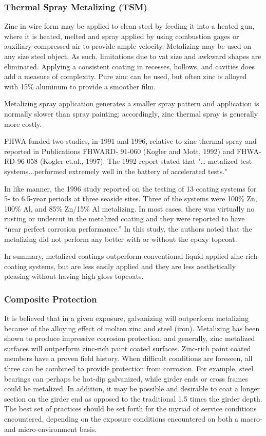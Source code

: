 \subsubsection{Thermal Spray Metalizing (TSM)}
Zinc in wire form may be applied to clean steel by feeding it into a heated gun, where it is heated, melted and
spray applied by using combustion gages or auxiliary compressed air to provide ample velocity. Metalizing may be
used on any size steel object. As such, limitations due to vat size and awkward shapes are eliminated. Applying a
consistent coating in recesses, hollows, and cavities does add a measure of complexity. Pure zinc can be used, but
often zinc is alloyed with 15\% aluminum to provide a smoother film.

Metalizing spray application generates a smaller spray pattern and application is normally slower than spray
painting; accordingly, zinc thermal spray is generally more costly.

FHWA funded two studies, in 1991 and 1996, relative to zinc thermal spray and reported in Publications FHWARD-
91-060 (Kogler and Mott, 1992) and FHWA-RD-96-058 (Kogler et.al., 1997). The 1992 report stated that "…
metalized test systems...performed extremely well in the battery of accelerated tests."

In like manner, the 1996 study reported on the testing of 13 coating systems for 5- to 6.5-year periods at three
seaside sites. Three of the systems were 100\% Zn, 100\% Al, and 85\% Zn/15\% Al metalizing. In most cases, there
was virtually no rusting or undercut in the metalized coating and they were reported to have “near perfect corrosion performance.” In this study, the authors noted that the metalizing did not perform any better with or without the
epoxy topcoat.

In summary, metalized coatings outperform conventional liquid applied zinc-rich coating systems, but are less
easily applied and they are less aesthetically pleasing without having high gloss topcoats.

\subsubsection{Composite Protection}
It is believed that in a given exposure, galvanizing will outperform metalizing because of the alloying effect of
molten zinc and steel (iron). Metalizing has been shown to produce impressive corrosion protection, and generally,
zinc metalized surfaces will outperform zinc-rich paint coated surfaces. Zinc-rich paint coated members have a
proven field history. When difficult conditions are foreseen, all three can be combined to provide protection from
corrosion. For example, steel bearings can perhaps be hot-dip galvanized, while girder ends or cross frames could be
metalized. In addition, it may be possible and desirable to coat a longer section on the girder end as opposed to the
traditional 1.5 times the girder depth. The best set of practices should be set forth for the myriad of service conditions
encountered, depending on the exposure conditions encountered on both a macro- and micro-environment basis.


